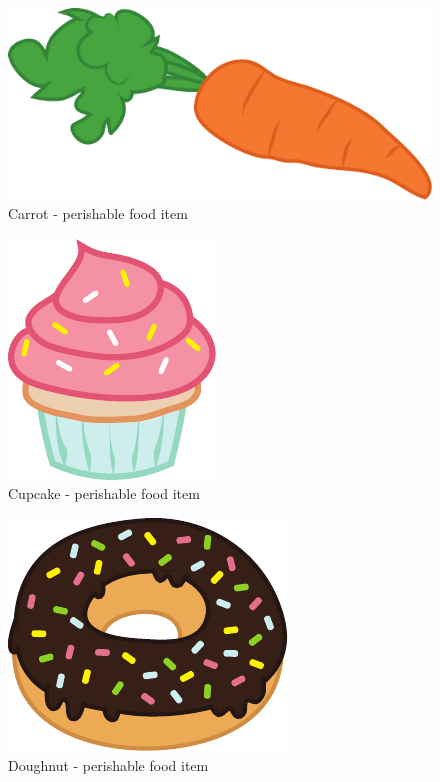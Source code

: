 \begin{figure}[p]
	\centering\includegraphics[width=.8\linewidth]{images/items_carrot}
	\caption{Carrot - perishable food item}
\end{figure}
\begin{figure}[p]
	\centering\includegraphics[width=.8\linewidth, height=.8\paperheight, keepaspectratio=true]{images/items_cupcake}
	\caption{Cupcake - perishable food item}
\end{figure}
\begin{figure}[p]
	\centering\includegraphics[width=.8\linewidth]{images/items_donut}
	\caption{Doughnut - perishable food item}
\end{figure}
